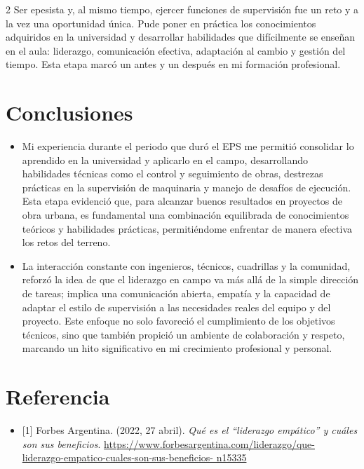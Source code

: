 \documentclass[12pt,spanish,Letterpaper,openany]{book}
\providecommand{\tightlist}{%
  \setlength{\itemsep}{0pt}\setlength{\parskip}{0pt}}
\begin{document}
\begin {multicols}{2}
Ser epesista y, al mismo tiempo, ejercer funciones de supervisión fue un reto y a la vez una oportunidad única. Pude poner en práctica los conocimientos adquiridos en la universidad y desarrollar habilidades que difícilmente se enseñan en el aula: liderazgo, comunicación efectiva, adaptación al cambio y gestión del tiempo. Esta etapa marcó un antes y un después en mi formación profesional.

\hypertarget{conclusiones-3}{%
\section{Conclusiones}\label{conclusiones-3}}

\begin{itemize}
\item
  Mi experiencia durante el periodo que duró el EPS me permitió consolidar lo aprendido en la universidad y aplicarlo en el campo, desarrollando habilidades técnicas como el control y seguimiento de obras, destrezas prácticas en la supervisión de maquinaria y manejo de desafíos de ejecución. Esta etapa evidenció que, para alcanzar buenos resultados en proyectos de obra urbana, es fundamental una combinación equilibrada de conocimientos teóricos y habilidades prácticas, permitiéndome enfrentar de manera efectiva los retos del terreno.
\item
  La interacción constante con ingenieros, técnicos, cuadrillas y la comunidad, reforzó la idea de que el liderazgo en campo va más allá de la simple dirección de tareas; implica una comunicación abierta, empatía y la capacidad de adaptar el estilo de supervisión a las necesidades reales del equipo y del proyecto. Este enfoque no solo favoreció el cumplimiento de los objetivos técnicos, sino que también propició un ambiente de colaboración y respeto, marcando un hito significativo en mi crecimiento profesional y personal.
\end{itemize}

\hypertarget{referencia}{%
\section{Referencia}\label{referencia}}

\begin{itemize}
\tightlist
\item
  {[}1{]} Forbes Argentina. (2022, 27 abril). \emph{Qué es el ``liderazgo empático'' y cuáles son sus beneficios}. \href{https://www.forbesargentina.com/liderazgo/que-liderazgo-empatico-cuales-son-sus-beneficios-n15335}{https://www.forbesargentina.com/liderazgo/que-
  liderazgo-empatico-cuales-son-sus-beneficios-
  n15335}
\end{itemize}

\end {multicols}
\end{document}
